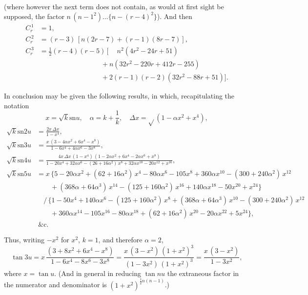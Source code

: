 \documentclass[11pt,a4paper]{book}
\providecommand{\sn}{\mathrm{sn}}
\begin{document}
(where however the next term does not contain, as would at first sight be supposed, the factor $n\,(n-1^2) \ldots \{n-(r-4)^2\}$). And then
\begin{align*}
C_r^{\,1} &= 1, \\
C_r^{\,2} &= (r-3)\,[n(2r-7) + (r-1)(8r-7)], \\
C_r^{\,3} &= \tfrac{1}{2}(r-4)(r-5)\,[\phantom{+}n^2(4r^2 - 24r + 51) \\
  &\qquad\qquad\qquad\qquad\quad + n(32r^2 - 220r + 412r - 255) \\
  &\qquad\qquad\qquad\qquad\quad + 2(r-1)(r-2)(32r^2 - 88r + 51)].
\end{align*}


In conclusion may be given the following results, in which, recapitulating the notation
\[
x = \sqrt{k} \sn u, \quad \alpha = k + \frac{1}{k}, \quad \Delta x = \sqrt{}(1 - \alpha x^2 + x^4),
\]
\begin{align*}
\sqrt{k} \sn 2u &= \frac{2x\,\Delta x}{1 - x^4}, \\[4pt]
\sqrt{k} \sn 3u &= \frac{x\,(3 - 4\alpha x^2 + 6x^4 - x^8)}{1 - 6x^4 + 4\alpha x^6 - 3x^8}, \\[6pt]
\sqrt{k} \sn 4u &= \frac{4x\,\Delta x\,(1 - x^4)\,(1 - 2\alpha x^2 + 6x^4 - 2\alpha x^6 + x^8)}{1 - 20x^4 + 32\alpha x^6 - (26 + 16\alpha^2)\,x^8 + 32\alpha x^{10} - 20x^{12} + x^{16}}, \\[6pt]
\sqrt{k} \sn 5u &= x\,\{5 - 20\alpha x^2 + (62 + 16\alpha^2)\,x^4 - 80\alpha x^6 - 105x^8 + 360\alpha x^{10} - (300 + 240\alpha^2)\,x^{12} \\
  &\qquad + (368\alpha + 64\alpha^3)\,x^{14} - (125 + 160\alpha^2)\,x^{16} + 140\alpha x^{18} - 50x^{20} + x^{24}\} \\
  &\quad /\,\{1 - 50x^4 + 140\alpha x^6 - (125 + 160\alpha^2)\,x^8 + (368\alpha + 64\alpha^3)\,x^{10} - (300 + 240\alpha^2)\,x^{12} \\
  &\qquad + 360\alpha x^{14} - 105x^{16} - 80\alpha x^{18} + (62 + 16\alpha^2)\,x^{20} - 20\alpha x^{22} + 5x^{24}\}, \\
  &\ \&\text{c.}
\end{align*}

Thus, writing $-x^2$ for $x^2$, $k = 1$, and therefore $\alpha = 2$,
\[
\tan 3u = x\,\frac{(3 + 8x^2 + 6x^4 - x^8)}{1 - 6x^4 - 8x^6 - 3x^8} = \frac{x\,(3-x^2)\,(1+x^2)^3}{(1-3x^2)\,(1+x^2)^3} = \frac{x\,(3-x^2)}{1-3x^2},
\]
where $x = \tan u$. (And in general in reducing $\tan nu$ the extraneous factor in the numerator and denominator is $(1+x^2)^{\frac{1}{2}n(n-1)}$.)
\end{document}

